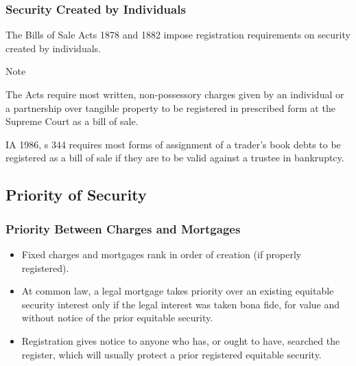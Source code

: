 \documentclass[
]{article}
\providecommand{\tightlist}{%
  \setlength{\itemsep}{0pt}\setlength{\parskip}{0pt}}
\newenvironment{env-486fc4cd-eb32-4215-aaa2-fc77a67eebc5}
{
    \savenotes\tcolorbox[blanker,breakable,left=5pt,borderline west={2pt}{-4pt}{blue}]
}
{
    \endtcolorbox\spewnotes
}
\begin{document}
\hypertarget{security-created-by-individuals}{%
\subsubsection{Security Created by
Individuals}\label{security-created-by-individuals}}

The Bills of Sale Acts 1878 and 1882 impose registration requirements on
security created by individuals.

\begin{env-486fc4cd-eb32-4215-aaa2-fc77a67eebc5}

Note

The Acts require most written, non-possessory charges given by an
individual or a partnership over tangible property to be registered in
prescribed form at the Supreme Court as a bill of sale.

\end{env-486fc4cd-eb32-4215-aaa2-fc77a67eebc5}

IA 1986, s 344 requires most forms of assignment of a trader's book
debts to be registered as a bill of sale if they are to be valid against
a trustee in bankruptcy.

\hypertarget{priority-of-security}{%
\subsection{Priority of Security}\label{priority-of-security}}

\hypertarget{priority-between-charges-and-mortgages}{%
\subsubsection{Priority Between Charges and
Mortgages}\label{priority-between-charges-and-mortgages}}

\begin{itemize}
\tightlist
\item
  Fixed charges and mortgages rank in order of creation (if properly
  registered).
\item
  At common law, a legal mortgage takes priority over an existing
  equitable security interest only if the legal interest was taken bona
  fide, for value and without notice of the prior equitable security.
\item
  Registration gives notice to anyone who has, or ought to have,
  searched the register, which will usually protect a prior registered
  equitable security.
\end{itemize}
\end{document}

